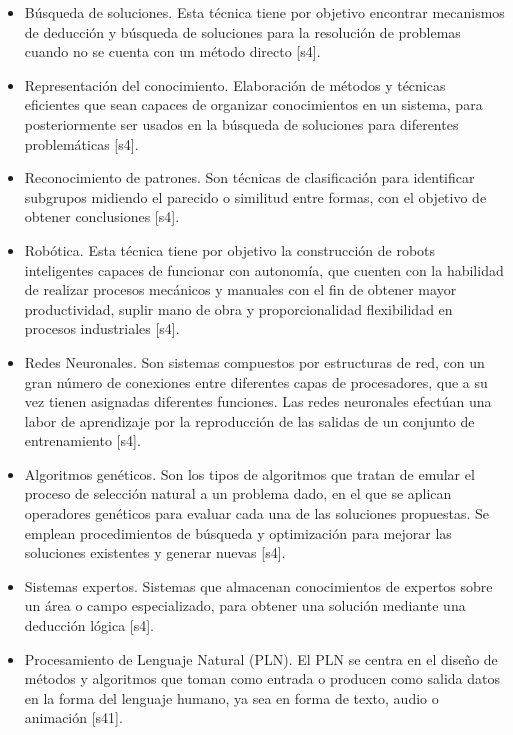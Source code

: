 \begin{itemize}
    \item Búsqueda de soluciones. Esta técnica tiene por objetivo encontrar mecanismos de deducción y búsqueda de soluciones para la resolución de problemas cuando no se cuenta con un método directo [s4].\\
\item Representación del conocimiento. Elaboración de métodos y técnicas eficientes que sean capaces de organizar conocimientos en un sistema, para posteriormente ser usados en la búsqueda de soluciones para diferentes problemáticas [s4].\\
\item Reconocimiento de patrones. Son técnicas de clasificación para identificar subgrupos midiendo el parecido o similitud entre formas, con el objetivo de obtener conclusiones [s4].\\
\item Robótica. Esta técnica tiene por objetivo la construcción de robots inteligentes capaces de funcionar con autonomía, que cuenten con la habilidad de realizar procesos mecánicos y manuales con el fin de obtener mayor productividad, suplir mano de obra y proporcionalidad flexibilidad en procesos industriales [s4].\\
\item Redes Neuronales. Son sistemas compuestos por estructuras de red, con un gran número de conexiones entre diferentes capas de procesadores, que a su vez tienen asignadas diferentes funciones. Las redes neuronales efectúan una labor de aprendizaje por la reproducción de las salidas de un conjunto de entrenamiento [s4].\\
\item Algoritmos genéticos. Son los tipos de algoritmos que tratan de emular el proceso de selección natural a un problema dado, en el que se aplican operadores genéticos para evaluar cada una de las soluciones propuestas. Se emplean procedimientos de búsqueda y optimización para mejorar las soluciones existentes y generar nuevas [s4].\\
\item Sistemas expertos. Sistemas que almacenan conocimientos de expertos sobre un área o campo especializado, para obtener una solución mediante una deducción lógica [s4]. \\
\item Procesamiento de Lenguaje Natural (PLN). El PLN se centra en el diseño de métodos y algoritmos que toman como entrada o producen como salida datos en la forma del lenguaje humano, ya sea en forma de texto, audio o animación [s41].

\end{itemize}

